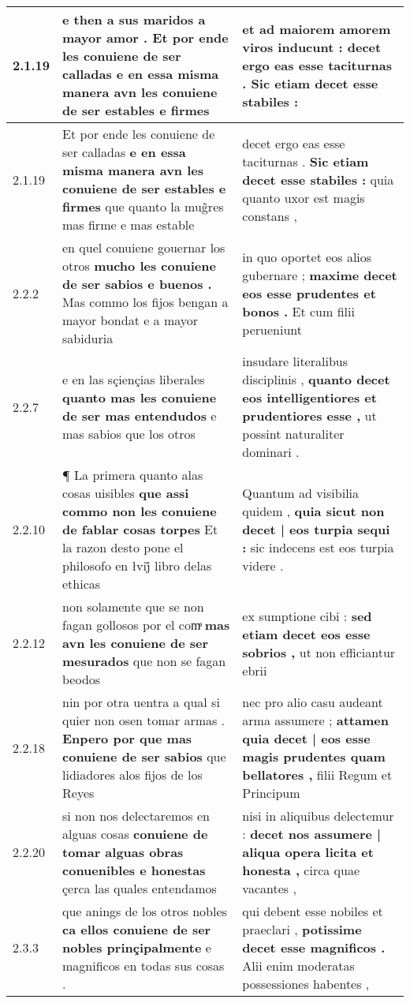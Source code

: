 \begin{tabular}{|p{1cm}|p{6.5cm}|p{6.5cm}|}
2.1.19 & e then a sus maridos a mayor amor . \textbf{ Et por ende les conuiene de ser calladas } e en essa misma manera avn les conuiene de ser estables e firmes & et ad maiorem amorem viros inducunt : \textbf{ decet ergo eas esse taciturnas . } Sic etiam decet esse stabiles : \\\hline
2.1.19 & Et por ende les conuiene de ser calladas \textbf{ e en essa misma manera avn les conuiene de ser estables e firmes } que quanto la mug̃res mas firme e mas estable & decet ergo eas esse taciturnas . \textbf{ Sic etiam decet esse stabiles : } quia quanto uxor est magis constans , \\\hline
2.2.2 & en quel conuiene gouernar los otros \textbf{ mucho les conuiene de ser sabios e buenos . } Mas commo los fijos bengan a mayor bondat e a mayor sabiduria & in quo oportet eos alios gubernare ; \textbf{ maxime decet eos esse prudentes et bonos . } Et cum filii perueniunt \\\hline
2.2.7 & e en las sçiençias liberales \textbf{ quanto mas les conuiene de ser mas entendudos } e mas sabios que los otros & insudare literalibus disciplinis , \textbf{ quanto decet eos intelligentiores et prudentiores esse , } ut possint naturaliter dominari . \\\hline
2.2.10 & ¶ La primera quanto alas cosas uisibles \textbf{ que assi commo non les conuiene de fablar cosas torpes } Et la razon desto pone el philosofo en łvij̊ libro delas ethicas & Quantum ad visibilia quidem , \textbf{ quia sicut non decet | eos turpia sequi : } sic indecens est eos turpia videre . \\\hline
2.2.12 & non solamente que se non fagan gollosos por el comͣ \textbf{ mas avn les conuiene de ser mesurados } que non se fagan beodos & ex sumptione cibi : \textbf{ sed etiam decet eos esse sobrios , } ut non efficiantur ebrii \\\hline
2.2.18 & nin por otra uentra a qual si quier non osen tomar armas . \textbf{ Enpero por que mas conuiene de ser sabios } que lidiadores alos fijos de los Reyes & nec pro alio casu audeant arma assumere ; \textbf{ attamen quia decet | eos esse magis prudentes quam bellatores , } filii Regum et Principum \\\hline
2.2.20 & si non nos delectaremos en alguas cosas \textbf{ conuiene de tomar alguas obras conuenibles e honestas } çerca las quales entendamos & nisi in aliquibus delectemur : \textbf{ decet nos assumere | aliqua opera licita et honesta , } circa quae vacantes , \\\hline
2.3.3 & que anings de los otros nobles \textbf{ ca ellos conuiene de ser nobles prinçipalmente } e magnificos en todas sus cosas . & qui debent esse nobiles et praeclari , \textbf{ potissime decet esse magnificos . } Alii enim moderatas possessiones habentes , \\\hline

\end{tabular}
